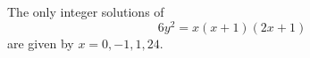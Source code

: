 \begin{proposition}
    The only integer solutions of
\[
    6y^2=x(x+1)(2x+1)
\]
    are given by $x=0,-1,1,24$.
\end{proposition}
